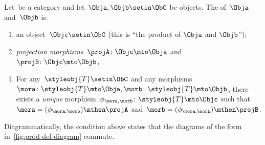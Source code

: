 \begin{ctdefinition}
    \label{def:categorical-product}
    Let~\CatC be a category and let~$\Obja, \Objb \setin \ObC$ be objects.
    The \emph{} of~$\Obja$ and~$\Objb$ is: \\
    \constit
    \begin{enumerate}
        \item an object~$\Objc \setin \ObC$ (this is ``the product of $\Obja$  and $\Objb$'');
        \item \emph{projection morphisms}~$\projA \colon \Objc \mto \Obja$ and~$\projB \colon \Objc \mto \Objb$,
    \end{enumerate}
    \condit
    \begin{enumerate}
        \item For any~$\styleobj{T} \setin \ObC$ and any morphisms~$\mora \colon \styleobj{T} \mto \Obja, \morb \colon \styleobj{T} \mto \Objb$, there exists a \emph{unique} morphism~$\phi_{\mora,\morb} \colon \styleobj{T} \mto \Objc$ such that~$\mora = (\phi_{\mora,
                      \morb})\mthen \projA$ and~$\morb=(\phi_{\mora, \morb})\mthen \projB$.
    \end{enumerate}
\end{ctdefinition}

\begin{marginfigure}
    \centering
    \caption{}
    \label{fig:prod-def-diagram}
\end{marginfigure}

\begin{remark}
    \label{re:prod-comm-diag}
    Diagrammatically, the condition above states that the diagrams of the form in~\cref{fig:prod-def-diagram} commute.
\end{remark}

\begin{marginfigure}
    \centering
    \caption{}
    \label{fig:prod-def-diagram-generic}
\end{marginfigure}

